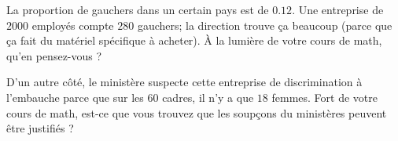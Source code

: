 
\begin{exercice}\label{exosmath-0672}

    La proportion de gauchers dans un certain pays est de \( 0.12\). Une entreprise de \( 2000\) employés compte \( 280\) gauchers; la direction trouve ça beaucoup (parce que ça fait du matériel spécifique à acheter). À la lumière de votre cours de math, qu'en pensez-vous ?

    D'un autre côté, le ministère suspecte cette entreprise de discrimination à l'embauche parce que sur les \( 60\) cadres, il n'y a que \( 18\) femmes. Fort de votre cours de math, est-ce que vous trouvez que les soupçons du ministères peuvent être justifiés ?

\end{exercice}
